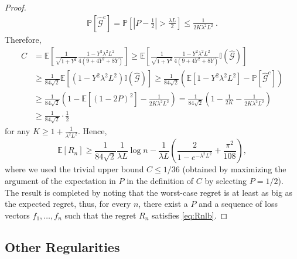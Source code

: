 \documentclass[english]{article}
\newcommand{\cG}{\mathcal{G}}
\newcommand{\Exp}[1]{\mathbb{E}\left[ #1 \right]}
\newcommand{\ind}{\mathbb{I}}
\newcommand{\Prob}[1]{\mathbb{P}\left[#1\right]}
\begin{document}
\begin{proof}
\begin{align*}
	\Prob{\widehat{\cG}^c} = \Prob{ \left| P-\frac{1}{2}\right| > \frac{\lambda L}{2} } \le \frac{1}{2 K \lambda^2 L^2}~.
	\end{align*}
Therefore,
	\begin{align*}
	C &= \Exp{\frac{1}{\sqrt{1+Y^2 }}\frac{1-Y^2\lambda^2L^2}{ 4 (9+ 4Y^2 +8 Y )}}
	 \ge \Exp{\frac{1}{\sqrt{1+Y^2 }}\frac{1-Y^2\lambda^2L^2}{ 4 (9+ 4Y^2 +8 Y )} \ind(\widehat{\cG}) } \\
	& \ge \frac{1}{84\sqrt{2}}\Exp{(1-Y^2\lambda^2L^2)\ind(\widehat{\cG})} 
	 \ge \frac{1}{84\sqrt{2}} \left( \Exp{1-Y^2\lambda^2L^2} - \Prob{\widehat{\cG}^c}\right) \\
	& \ge \frac{1}{84\sqrt{2}} \left( 1- \Exp{(1-2P)^2} - \frac{1}{2K\lambda^2L^2}\right)
	= \frac{1}{84\sqrt{2}} \left( 1 - \frac{1}{2K} - \frac{1}{2K\lambda^2L^2} \right) \\
	& \ge \frac{1}{84\sqrt{2}} \cdot \frac{1}{2}
	\end{align*}
	for any $K \ge 1+ \frac{1}{\lambda^2 L^2}$.
	Hence, 
	\[
	\Exp{R_n} \ge \frac{1}{84\sqrt{2}}\frac{1}{\lambda L} \log n  - \frac{1}{\lambda L} \left(\frac{2}{1-e^{-\lambda^2L^2}} + \frac{\pi^2}{108}\right),
	\]
	where we used the trivial upper bound $C \le 1/36$ (obtained by maximizing the argument of the expectation in $P$ in the definition of $C$ by selecting $P=1/2$).
	The result is completed by noting that the worst-case regret is at least as big as the expected regret, thus, for every $n$, there exist a $P$ and a sequence of loss vectors $f_1,\ldots,f_n$ such that the regret $R_n$ satisfies \eqref{eq:Rnlb}. 
\end{proof}


\subsection{Other Regularities}
\end{document}
